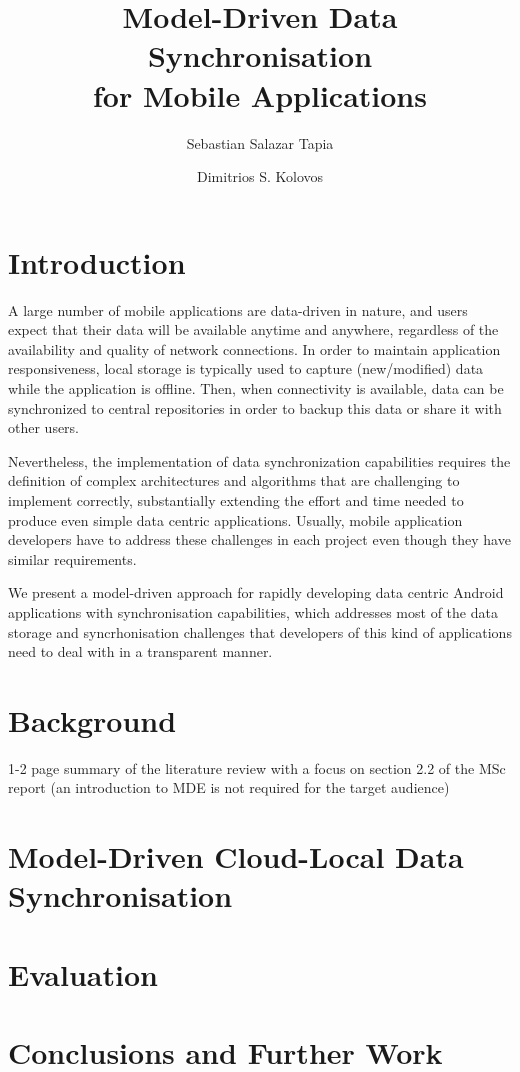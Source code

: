 \documentclass[runningheads,a4paper]{llncs}
\begin{document}
\title{Model-Driven Data Synchronisation \\ for Mobile Applications}
\author{Sebastian Salazar Tapia\and Dimitrios S. Kolovos}
\maketitle

\begin{abstract}

\end{abstract}

\section{Introduction}
A large number of mobile applications are data-driven in nature, and users expect that their data will be available anytime and anywhere, regardless of the availability and quality of network connections. In order to maintain application responsiveness, local storage is typically used to capture (new/modified) data while the application is offline. Then, when connectivity is available, data can be synchronized to central repositories in order to backup this data or share it with other users.

Nevertheless, the implementation of data synchronization capabilities requires the definition of complex architectures and algorithms that are challenging to implement correctly, substantially extending the effort and time needed to produce even simple data centric applications. Usually, mobile application developers have to address these challenges in each project even though they have similar requirements.

We present a model-driven approach for rapidly developing data centric Android applications with synchronisation capabilities, which addresses most of the data storage and syncrhonisation challenges that developers of this kind of applications need to deal with in a transparent manner.

\section{Background}

1-2 page summary of the literature review with a focus on section 2.2 of the MSc report (an introduction to MDE is not required for the target audience)

\section{Model-Driven Cloud-Local Data Synchronisation}

\section{Evaluation}

\section{Conclusions and Further Work}
\end{document}
